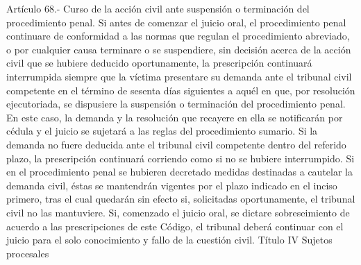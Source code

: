     Artículo 68.- Curso de la acción civil ante suspensión o terminación del procedimiento penal. Si antes de comenzar el juicio oral, el procedimiento penal continuare de conformidad a las normas que regulan el procedimiento abreviado, o por cualquier causa terminare o se suspendiere, sin decisión acerca de la acción civil que se hubiere deducido oportunamente, la prescripción continuará interrumpida siempre que la víctima presentare su demanda ante el tribunal civil competente en el término de sesenta días siguientes a aquél en que, por resolución ejecutoriada, se dispusiere la suspensión o terminación del procedimiento penal.
    En este caso, la demanda y la resolución que recayere en ella se notificarán por cédula y el juicio se sujetará a las reglas del procedimiento sumario. Si la demanda no fuere deducida ante el tribunal civil competente dentro del referido plazo, la prescripción continuará corriendo como si no se hubiere interrumpido.
    Si en el procedimiento penal se hubieren decretado medidas destinadas a cautelar la demanda civil, éstas se mantendrán vigentes por el plazo indicado en el inciso primero, tras el cual quedarán sin efecto si, solicitadas oportunamente, el tribunal civil no las mantuviere.
    Si, comenzado el juicio oral, se dictare sobreseimiento de acuerdo a las prescripciones de este Código, el tribunal deberá continuar con el juicio para el solo conocimiento y fallo de la cuestión civil.
    Título IV
    Sujetos procesales

